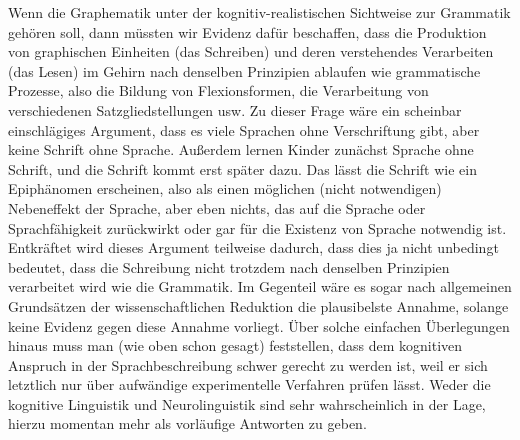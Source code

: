 Wenn die Graphematik unter der kognitiv-realistischen Sichtweise zur Grammatik gehören soll, dann müssten wir Evidenz dafür beschaffen, dass die Produktion von graphischen Einheiten (das Schreiben) und deren verstehendes Verarbeiten (das Lesen) im Gehirn nach denselben Prinzipien ablaufen wie grammatische Prozesse, also die Bildung von Flexionsformen, die Verarbeitung von verschiedenen Satzgliedstellungen usw.
Zu dieser Frage wäre ein scheinbar einschlägiges Argument, dass es viele Sprachen ohne Verschriftung gibt, aber keine Schrift ohne Sprache.
Außerdem lernen Kinder zunächst Sprache ohne Schrift, und die Schrift kommt erst später dazu.
Das lässt die Schrift wie ein Epiphänomen erscheinen, also als einen möglichen (nicht notwendigen) Nebeneffekt der Sprache, aber eben nichts, das auf die Sprache oder Sprachfähigkeit zurückwirkt oder gar für die Existenz von Sprache notwendig ist.
Entkräftet wird dieses Argument teilweise dadurch, dass dies ja nicht unbedingt bedeutet, dass die Schreibung nicht trotzdem nach denselben Prinzipien verarbeitet wird wie die Grammatik.
Im Gegenteil wäre es sogar nach allgemeinen Grundsätzen der wissenschaftlichen Reduktion die plausibelste Annahme, solange keine Evidenz gegen diese Annahme vorliegt.
Über solche einfachen Überlegungen hinaus muss man (wie oben schon gesagt) feststellen, dass dem kognitiven Anspruch in der Sprachbeschreibung schwer gerecht zu werden ist, weil er sich letztlich nur über aufwändige experimentelle Verfahren prüfen lässt.
Weder die kognitive Linguistik und Neurolinguistik sind sehr wahrscheinlich in der Lage, hierzu momentan mehr als vorläufige Antworten zu geben.

